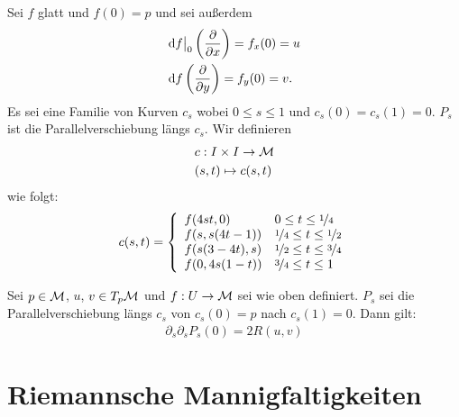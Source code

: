 Sei $f$ glatt und $f(0)=p$ und sei außerdem
\begin{align}
& \dd f \big\vert_0 \left( \pdv{x} \right) = f_x (0) = u\\
& \dd f \left( \pdv{y}\right) = f_y(0) = v.
\end{align}
Es sei eine Familie von Kurven $c_s$ wobei $0 \leq s \leq 1$ und $c_s (0) = c_s(1) = 0$.
$P_s$ ist die Parallelverschiebung längs $c_s$.
Wir definieren
\begin{align}
&c : I \times I \to \mathcal{M}\\
&(s, t) \mapsto c(s,t)
\end{align}
wie folgt:
\begin{align}
c(s, t) = \left\{
\begin{array}{ll}
f(4 s t, 0) & 0 \leq t \leq \nicefrac{1}{4} \\
f(s, s(4t-1)) & \nicefrac{1}{4} \leq t \leq \nicefrac{1}{2}\\
f(s(3-4t), s) & \nicefrac{1}{2} \leq t \leq \nicefrac{3}{4}\\
f(0, 4s(1-t)) & \nicefrac{3}{4} \leq t \leq 1
\end{array}
\right. 
\end{align}
\begin{satz}
Sei $p \in \mathcal{M}$, $u$, $v \in T_p \mathcal{M}$ und $f: U \to \mathcal{M}$ sei wie oben definiert.
$P_s$ sei die Parallelverschiebung längs $c_s$ von $c_s(0) = p$ nach $c_s(1) = 0$.
Dann gilt:
\begin{align}
\partial_s \partial_s P_s(0) = 2 R (u, v)
\end{align}
\end{satz}

\chapter{Riemannsche Mannigfaltigkeiten}

